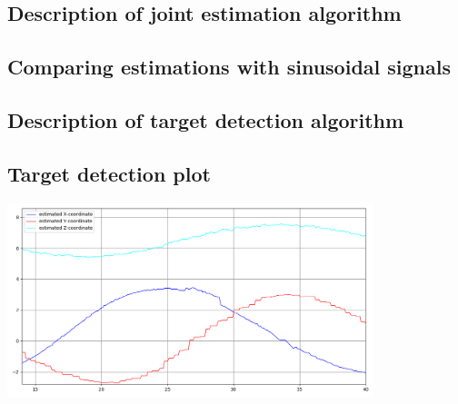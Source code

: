 
\subsection{Description of joint estimation algorithm}

\subsection{Comparing estimations with sinusoidal signals}

\subsection{Description of target detection algorithm}

\subsection{Target detection plot}
\begin{center}
    \includegraphics[width=0.8\textwidth]{plots/q2_2.png}
\end{center}

